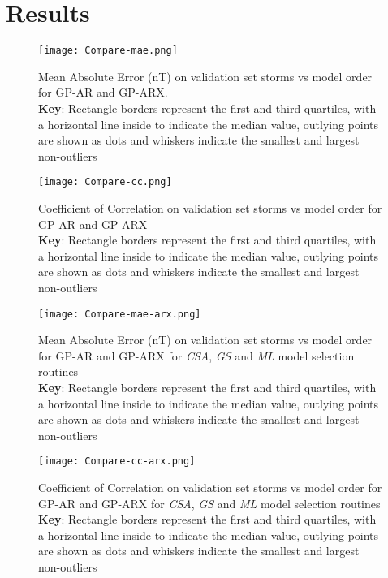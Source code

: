\section{Results}\label{sec:res}

\begin{figure}
    \noindent\texttt{[image: Compare-mae.png]}
    \caption{Mean Absolute Error (\si{\nano\tesla}) on validation set storms vs model order for GP-AR and GP-ARX. \\ \textbf{Key}: Rectangle borders represent the first and third quartiles, with a horizontal line inside to indicate the median value, outlying points are shown as dots and whiskers indicate the smallest and largest non-outliers}
    \label{fig:CompareMae}
\end{figure}
    
\begin{figure}
    \noindent\texttt{[image: Compare-cc.png]}
    \caption{Coefficient of Correlation on validation set storms vs model order for GP-AR and GP-ARX \\ \textbf{Key}: Rectangle borders represent the first and third quartiles, with a horizontal line inside to indicate the median value, outlying points are shown as dots and whiskers indicate the smallest and largest non-outliers}
    \label{fig:CompareCC}
\end{figure}
    
    
\begin{figure}
    \noindent\texttt{[image: Compare-mae-arx.png]}
    \caption{Mean Absolute Error (\si{\nano\tesla}) on validation set storms vs model order for GP-AR and GP-ARX for \emph{CSA}, \emph{GS} and \emph{ML} model selection routines \\ \textbf{Key}: Rectangle borders represent the first and third quartiles, with a horizontal line inside to indicate the median value, outlying points are shown as dots and whiskers indicate the smallest and largest non-outliers}
    \label{fig:CompareMaeARX}
\end{figure}
    
\begin{figure}
    \noindent\texttt{[image: Compare-cc-arx.png]}
    \caption{Coefficient of Correlation on validation set storms vs model order for GP-AR and GP-ARX for \emph{CSA}, \emph{GS} and \emph{ML} model selection routines \\ \textbf{Key}: Rectangle borders represent the first and third quartiles, with a horizontal line inside to indicate the median value, outlying points are shown as dots and whiskers indicate the smallest and largest non-outliers}
    \label{fig:CompareCCARX}
\end{figure}
    

